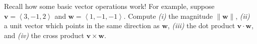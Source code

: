 Recall how some basic vector operations work!  For example, suppose $\mathbf{v}=\left<3,-1,2\right>$ and $\mathbf{w}=\left<1,-1,-1\right>$.  Compute \emph{(i)} the magnitude $\|\mathbf{w}\|$, \emph{(ii)} a unit vector which points in the same direction as $\mathbf{w}$, \emph{(iii)} the dot product $\mathbf{v}\cdot\mathbf{w}$, and \emph{(iv)} the cross product $\mathbf{v}\times\mathbf{w}$.
